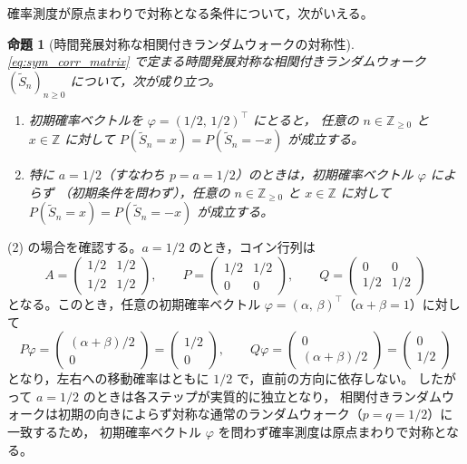 \documentclass[a4j,dvipdfmx]{jsarticle}
\theoremstyle{plainnote}
\newtheorem{proposition}[theorem]{命題}
\begin{document}
確率測度が原点まわりで対称となる条件について，次がいえる。

\begin{proposition}[時間発展対称な相関付きランダムウォークの対称性]
\label{prop:sym}
\eqref{eq:sym_corr_matrix} で定まる時間発展対称な相関付きランダムウォーク $(\tilde{S}_n)_{n \geq 0}$ について，次が成り立つ。
\begin{enumerate}
  \item 初期確率ベクトルを $\varphi = (1/2,\,1/2)^\top$ にとると，
        任意の $n \in \mathbb{Z}_{\geq 0}$ と $x \in \mathbb{Z}$ に対して
        $P(\tilde{S}_n = x) = P(\tilde{S}_n = -x)$ が成立する。
  \item 特に $a = 1/2$（すなわち $p = a = 1/2$）のときは，初期確率ベクトル $\varphi$ によらず
        （初期条件を問わず），任意の $n \in \mathbb{Z}_{\geq 0}$ と $x \in \mathbb{Z}$ に対して
        $P(\tilde{S}_n = x) = P(\tilde{S}_n = -x)$ が成立する。
\end{enumerate}
\end{proposition}

(2) の場合を確認する。$a = 1/2$ のとき，コイン行列は
\[
  A = \begin{pmatrix} 1/2 & 1/2 \\ 1/2 & 1/2 \end{pmatrix}, \qquad
  P = \begin{pmatrix} 1/2 & 1/2 \\ 0 & 0 \end{pmatrix}, \qquad
  Q = \begin{pmatrix} 0 & 0 \\ 1/2 & 1/2 \end{pmatrix}
\]
となる。このとき，任意の初期確率ベクトル $\varphi = (\alpha,\,\beta)^\top$（$\alpha + \beta = 1$）に対して
\[
  P\varphi = \begin{pmatrix} (\alpha+\beta)/2 \\ 0 \end{pmatrix} = \begin{pmatrix} 1/2 \\ 0 \end{pmatrix}, \qquad
  Q\varphi = \begin{pmatrix} 0 \\ (\alpha+\beta)/2 \end{pmatrix} = \begin{pmatrix} 0 \\ 1/2 \end{pmatrix}
\]
となり，左右への移動確率はともに $1/2$ で，直前の方向に依存しない。
したがって $a = 1/2$ のときは各ステップが実質的に独立となり，
相関付きランダムウォークは初期の向きによらず対称な通常のランダムウォーク（$p=q=1/2$）に一致するため，
初期確率ベクトル $\varphi$ を問わず確率測度は原点まわりで対称となる。
\end{document}
